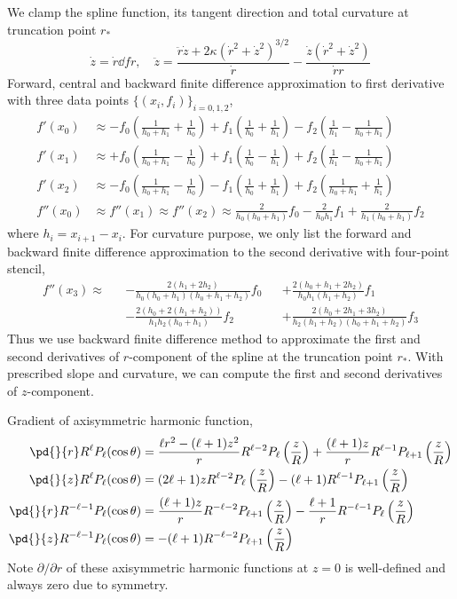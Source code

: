 \documentclass{jfm}
\begin{document}
We clamp the spline function, its tangent direction and total curvature at truncation point $r_*$
\begin{equation}
\dot{z}=\dot{r}\dd{f}{r},\quad
\ddot{z}
=\frac{\ddot{r} \dot{z}+2\kappa   (\dot{r}^2+\dot{z}^2)^{3/2}
 }{\dot{r} }
-
\frac{\dot{z} \left(\dot{r}^2+\dot{z}^2\right)}{\dot{r} r}
\end{equation}
Forward, central and backward finite difference approximation to first derivative 
with three data points $\{(x_i,f_i)\}_{i=0,1,2}$,
\begin{align}
f'(x_0)&\approx-f_0 \left(\frac{1}{h_0+h_1}+\frac{1}{h_0}\right)+f_1 \left(\frac{1}{h_0}
+\frac{1}{h_1}\right)-f_2 \left(\frac{1}{h_1}-\frac{1}{h_0+h_1}\right)\\
f'(x_1)&\approx+f_0 \left(\frac{1}{h_0+h_1}-\frac{1}{h_0}\right)+f_1 \left(\frac{1}{h_0}
-\frac{1}{h_1}\right)+f_2 \left(\frac{1}{h_1}-\frac{1}{h_0+h_1}\right)\\
f'(x_2)&\approx-f_0 \left(\frac{1}{h_0+h_1}-\frac{1}{h_0}\right)-f_1 \left(\frac{1}{h_0}
+\frac{1}{h_1}\right)+f_2 \left(\frac{1}{h_0+h_1}+\frac{1}{h_1}\right)\\
f''(x_0)&\approx f''(x_1)\approx f''(x_2)\approx\frac{2}{h_0(h_0+h_1)} f_ 0-\frac{2 }{h_0 h_1}f_ 1
+ \frac{2}{ h_ 1(h_ 0+h_ 1)}f_ 2
\end{align}
where $h_i = x_{i+1} - x_i$.
For curvature purpose, we only list the forward and
backward finite difference approximation to the second derivative with four-point stencil,
\begin{align}
\nonumber f''(x_3)\approx&&-\frac{2 (h_1+2 h_2)}{h_0 (h_0+h_1) (h_0+h_1+h_2)} f_0
&&+\frac{2  (h_0+h_1+2 h_2)}{h_0 h_1 (h_1+h_2)}f_1\\
\phantom{\approx}&&-\frac{2  (h_0+2 (h_1+h_2))}{h_1 h_2 (h_0+h_1)}f_2
&&+\frac{2  (h_0+2 h_1+3 h_2)}{h_2 (h_1+h_2) (h_0+h_1+h_2)}f_3
\end{align}
Thus we use backward finite difference method to approximate the first and second derivatives of $r$-component of the spline at the truncation point $r_*$.
With prescribed slope and curvature, we can compute the first and second derivatives of $z$-component.

Gradient of axisymmetric harmonic function,
\begin{align}
\pd{}{r}R^\ell P_\ell(\cos\theta)
&=\frac{ \ell r^2-(\ell +1)z^2 }{r}R^{\ell-2}P_\ell\left(\frac{z}{R}\right)
+\frac{(\ell+1) z }{r} R^{\ell-1}P_{\ell+1}\left(\frac{z}{R}\right)\\
\pd{}{z}R^\ell P_\ell(\cos\theta)
&=(2 \ell+1) z R^{\ell-2} P_\ell\left(\frac{z}{R}\right)-(\ell+1) R^{\ell-1} P_{\ell+1}\left(\frac{z}{R}\right)\\
\pd{}{r}R^{-\ell-1} P_\ell(\cos\theta)&=\frac{(\ell+1) z }{r}R^{-\ell-2} P_{\ell+1}\left(\frac{z}{R}\right)
-\frac{\ell+1 }{r}R^{-\ell-1} P_\ell\left(\frac{z}{R}\right)\\
\pd{}{z}R^{-\ell-1} P_\ell(\cos\theta)&=-(\ell+1) R^{-\ell-2} P_{\ell+1}\left(\frac{z}{R}\right)
\end{align}
Note $\partial /\partial r$ of these axisymmetric harmonic functions at $z=0$ is well-defined and always zero due to symmetry.
\end{document}
